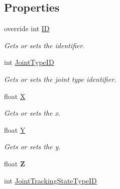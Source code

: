 \subsection*{Properties}
\begin{DoxyCompactItemize}
\item 
override int \mbox{\hyperlink{class_bar_none_1_1_shared_1_1_data_transfer_1_1_joint_d_t_o_af7a712518999ef3af5b54fc5afbdd4c3}{ID}}
\begin{DoxyCompactList}\small\item\em Gets or sets the identifier. \end{DoxyCompactList}\item 
int \mbox{\hyperlink{class_bar_none_1_1_shared_1_1_data_transfer_1_1_joint_d_t_o_a8918eb7960d96afffc34aef90c94eb96}{Joint\+Type\+ID}}
\begin{DoxyCompactList}\small\item\em Gets or sets the joint type identifier. \end{DoxyCompactList}\item 
float \mbox{\hyperlink{class_bar_none_1_1_shared_1_1_data_transfer_1_1_joint_d_t_o_a7520819fffdfd70055358527d57aa549}{X}}
\begin{DoxyCompactList}\small\item\em Gets or sets the x. \end{DoxyCompactList}\item 
float \mbox{\hyperlink{class_bar_none_1_1_shared_1_1_data_transfer_1_1_joint_d_t_o_aa05c1d98ed2017d1dec699558fc8d4d3}{Y}}
\begin{DoxyCompactList}\small\item\em Gets or sets the y. \end{DoxyCompactList}\item 
\mbox{\label{class_bar_none_1_1_shared_1_1_data_transfer_1_1_joint_d_t_o_a564cb1d1b96a4ade32068bcbe58b195a}} 
float {\bfseries Z}
\item 
int \mbox{\hyperlink{class_bar_none_1_1_shared_1_1_data_transfer_1_1_joint_d_t_o_a5ded9302829f970531c608b0c86fe4a1}{Joint\+Tracking\+State\+Type\+ID}}

\end{DoxyCompactItemize}

